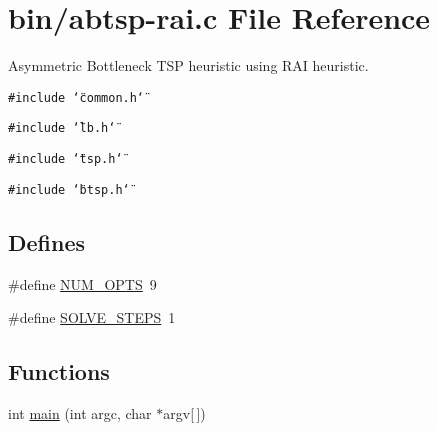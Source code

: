 \hypertarget{abtsp-rai_8c}{
\section{bin/abtsp-rai.c File Reference}
\label{abtsp-rai_8c}
}
Asymmetric Bottleneck TSP heuristic using RAI heuristic. 

{\tt \#include \char`\"{}common.h\char`\"{}}\par
{\tt \#include \char`\"{}lb.h\char`\"{}}\par
{\tt \#include \char`\"{}tsp.h\char`\"{}}\par
{\tt \#include \char`\"{}btsp.h\char`\"{}}\par
\subsection*{Defines}
\begin{CompactItemize}
\item 
\#define \hyperlink{abtsp-rai_8c_9b58b2c4af931c8486a986c9deca40f5}{NUM\_\-OPTS}~9
\item 
\#define \hyperlink{abtsp-rai_8c_ceebcce8f411269df7b99e78247d7497}{SOLVE\_\-STEPS}~1
\end{CompactItemize}
\subsection*{Functions}
\begin{CompactItemize}
\item 
int \hyperlink{abtsp-rai_8c_0ddf1224851353fc92bfbff6f499fa97}{main} (int argc, char $\ast$argv\mbox{[}$\,$\mbox{]})
\end{CompactItemize}
